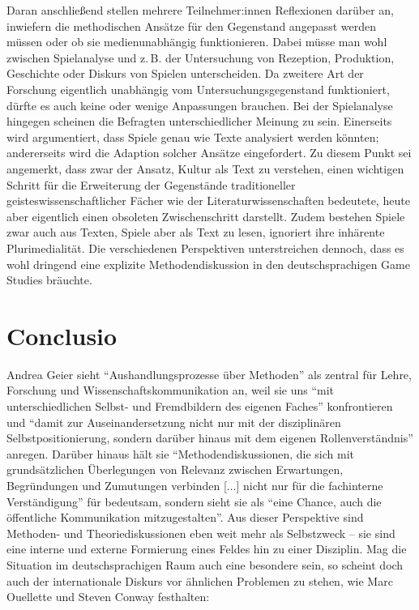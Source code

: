\documentclass{scrartcl}
\begin{document}
Daran anschließend stellen mehrere Teilnehmer:innen Reflexionen darüber an, inwiefern die methodischen Ansätze für den Gegenstand angepasst werden müssen oder ob sie medienunabhängig funktionieren.
Dabei müsse man wohl zwischen Spielanalyse und z.\,B. der Untersuchung von Rezeption, Produktion, Geschichte oder Diskurs von Spielen unterscheiden.
Da zweitere Art der Forschung eigentlich unabhängig vom Untersuchungsgegenstand funktioniert, dürfte es auch keine oder wenige Anpassungen brauchen.
Bei der Spielanalyse hingegen scheinen die Befragten unterschiedlicher Meinung zu sein.
Einerseits wird argumentiert, dass Spiele genau wie Texte analysiert werden könnten; andererseits wird die Adaption solcher Ansätze eingefordert.
Zu diesem Punkt sei angemerkt, dass zwar der Ansatz, Kultur als Text zu verstehen,\autocite[Vgl.][]{bassler_kultur_2002} einen wichtigen Schritt für die Erweiterung der Gegenstände traditioneller geisteswissenschaftlicher Fächer wie der Literaturwissenschaften bedeutete, heute aber eigentlich einen obsoleten Zwischenschritt darstellt.
Zudem bestehen Spiele zwar auch aus Texten,\autocite[Vgl. hierzu][]{cole_games_2020} Spiele aber als Text zu lesen, ignoriert ihre inhärente Plurimedialität.
Die verschiedenen Perspektiven unterstreichen dennoch, dass es wohl dringend eine explizite Methodendiskussion in den deutschsprachigen Game Studies bräuchte.


\section{Conclusio}\label{sec:conclusio}
Andrea Geier sieht \enquote{Aushandlungsprozesse über Methoden} als zentral für Lehre, Forschung und Wissenschaftskommunikation an, weil sie uns \enquote{mit unterschiedlichen Selbst- und Fremdbildern des eigenen Faches} konfrontieren und \enquote{damit zur Auseinandersetzung nicht nur mit der disziplinären Selbstpositionierung, sondern darüber hinaus mit dem eigenen Rollenverständnis} anregen.\autocite[][S.~847]{geier_methodendebatten_2021}
Darüber hinaus hält sie \enquote{Methodendiskussionen, die sich mit grundsätzlichen Überlegungen von Relevanz zwischen Erwartungen, Begründungen und Zumutungen verbinden [$\ldots$] nicht nur für die fachinterne Verständigung} für bedeutsam, sondern sieht sie als \enquote{eine Chance, auch die öffentliche Kommunikation mitzugestalten}.\autocite[][S.~853]{geier_methodendebatten_2021}
Aus dieser Perspektive sind Methoden- und Theoriediskussionen eben weit mehr als Selbstzweck -- sie sind eine interne und externe Formierung eines Feldes hin zu einer Disziplin.
Mag die Situation im deutschsprachigen Raum auch eine besondere sein, so scheint doch auch der internationale Diskurs vor ähnlichen Problemen zu stehen, wie Marc Ouellette und Steven Conway festhalten:
\end{document}
